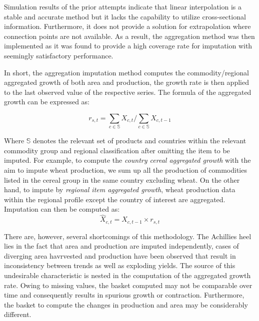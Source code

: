 \documentclass[nojss]{jss}\usepackage{graphicx, color}
\begin{document}
Simulation results of the prior attempts indicate that linear
interpolation is a stable and accurate method but it lacks the
capability to utilize cross-sectional information. Furthermore, it
does not provide a solution for extrapolation where connection points
are not available. As a result, the aggregation method was then
implemented as it was found to provide a high coverage rate for
imputation with seemingly satisfactory performance.

In short, the aggregation imputation method computes the
commodity/regional aggregated growth of both area and production, the
growth rate is then applied to the last observed value of the
respective series. The formula of the aggregated growth can be
expressed as:

\begin{equation}
  \label{eq:aggregateGrowth}
  r_{s, t} = \sum_{c \in \mathbb{S}} X_{c, t}/\sum_{c \in \mathbb{S}} X_{c, t-1}
\end{equation}

Where $\mathbb{S}$ denotes the relevant set of products and countries
within the relevant commodity group and regional classification after
omitting the item to be imputed. For example, to compute the
\textit{country cereal aggregated growth} with the aim to impute wheat
production, we sum up all the production of commodities listed in the
cereal group in the same country excluding wheat. On the other hand,
to impute by \textit{regional item aggregated growth}, wheat
production data within the regional profile except the country of
interest are aggregated.\\


Imputation can then be computed as:
\begin{equation}
  \hat{X}_{c, t} = X_{c, t-1} \times r_{s, t}
\end{equation}
  

There are, however, several shortcomings of this methodology. The
Achillies heel lies in the fact that area and production are imputed
independently, cases of diverging area havrvested and production have
been observed that result in inconsistency between trends as well as
exploding yields. The source of this undesirable characteristic is
nested in the computation of the aggregated growth rate. Owing to
missing values, the basket computed may not be comparable over time
and consequently results in spurious growth or
contraction. Furthermore, the basket to compute the changes in
production and area may be considerably different.
\end{document}
